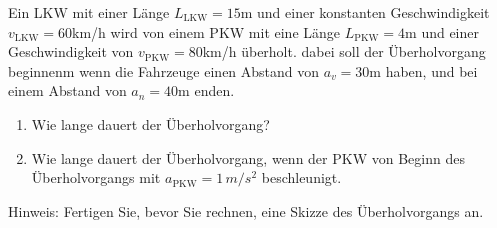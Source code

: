 \begin{ExerciseBlock}
Ein LKW mit einer Länge $L_\text{LKW}=15$m und einer konstanten Geschwindigkeit $v_\text{LKW} = 60$km/h wird von einem PKW mit eine Länge $L_\text{PKW} = 4$m und einer Geschwindigkeit von $v_\text{PKW} = 80$km/h überholt. dabei soll der Überholvorgang beginnenm wenn die Fahrzeuge einen Abstand von $a_v = 30$m haben, und bei einem Abstand von $a_n = 40$m enden.

\begin{enumerate}
	\item Wie lange dauert der Überholvorgang?

	\item Wie lange dauert der Überholvorgang, wenn der PKW von Beginn des Überholvorgangs mit $a_\text{PKW} = 1 \, m/s^2$ beschleunigt.

\end{enumerate}

Hinweis: Fertigen Sie, bevor Sie rechnen, eine Skizze des Überholvorgangs an.
\end{ExerciseBlock}
